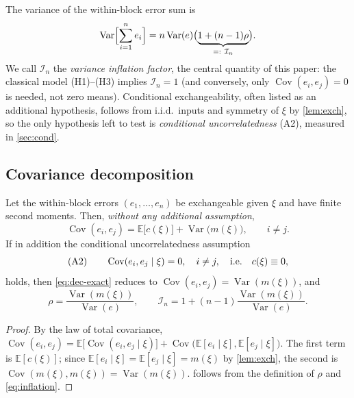 \documentclass[review,hidelinks,oneeqnum,onetabnum,onefignum,onethmnum]{siamart251216}
\begin{document}
The variance of the within-block error sum is
\begin{equation}
\operatorname{Var}\Bigl[\sum_{i=1}^{n}e_i\Bigr]
= n\operatorname{Var}(e)\bigl(\underbrace{1+(n-1)\rho}_{=:\ \mathcal I_n}\bigr).
\label{eq:inflation}
\end{equation}
We call $\mathcal I_n$ the \emph{variance inflation factor}, the central quantity
of this paper: the classical model (H1)--(H3) implies $\mathcal I_n=1$ (and
conversely, only $\operatorname{Cov}(e_i,e_j)=0$ is needed, not zero means).
Conditional exchangeability, often listed as an additional hypothesis, follows
from i.i.d.\ inputs and symmetry of $\xi$ by \cref{lem:exch}, so the only
hypothesis left to test is \emph{conditional uncorrelatedness} (A2), measured in
\cref{sec:cond}.

\subsection{Covariance decomposition}

\begin{proposition}
\label{prop:decomp}
Let the within-block errors $(e_1,\dots,e_n)$ be exchangeable given $\xi$ and
have finite second moments. Then, \emph{without any additional assumption},
\begin{equation}
\operatorname{Cov}(e_i,e_j)=\mathbb{E}\bigl[c(\xi)\bigr]+\operatorname{Var}\bigl(m(\xi)\bigr),
\qquad i\ne j .
\label{eq:dec-exact}
\end{equation}
If in addition the conditional uncorrelatedness assumption
\begin{equation}
\textup{(A2)}\qquad
\operatorname{Cov}(e_i,e_j\mid\xi)=0,\quad i\ne j,
\quad\text{i.e.}\quad c(\xi)\equiv0,
\label{eq:A2}
\end{equation}
holds, then \cref{eq:dec-exact} reduces to
$\operatorname{Cov}(e_i,e_j)=\operatorname{Var}(m(\xi))$, and
\begin{equation}
\rho=\frac{\operatorname{Var}(m(\xi))}{\operatorname{Var}(e)},
\qquad
\mathcal I_n=1+(n-1)\frac{\operatorname{Var}(m(\xi))}{\operatorname{Var}(e)} .
\label{eq:rho}
\end{equation}
\end{proposition}

\begin{proof}
By the law of total covariance,
$\operatorname{Cov}(e_i,e_j)
=\mathbb{E}\bigl[\operatorname{Cov}(e_i,e_j\mid\xi)\bigr]
+\operatorname{Cov}\bigl(\mathbb{E}[e_i\mid\xi],\mathbb{E}[e_j\mid\xi]\bigr)$.
The first term is $\mathbb{E}[c(\xi)]$; since
$\mathbb{E}[e_i\mid\xi]=\mathbb{E}[e_j\mid\xi]=m(\xi)$ by \cref{lem:exch}, the
second is $\operatorname{Cov}(m(\xi),m(\xi))=\operatorname{Var}(m(\xi))$.
 follows from the definition of $\rho$ and \cref{eq:inflation}.
\end{proof}
\end{document}
